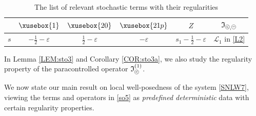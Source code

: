 \documentclass[%
11pt,  reqno]{amsart}
\def\<#1>{\xusebox{#1}}
\newcommand{\pe}{\mathbin{\scaleobj{0.7}{\tikz \draw (0,0) node[shape=circle,draw,inner sep=0pt,minimum size=8.5pt] {\scriptsize  $=$};}}}
\newcommand{\pl}{\mathbin{\scaleobj{0.7}{\tikz \draw (0,0) node[shape=circle,draw,inner sep=0pt,minimum size=8.5pt] {\scriptsize $<$};}}}
\newcommand{\1}{\hspace{0.2mm}\text{I}\hspace{0.2mm}}
\newcommand{\noi}{\noindent}
\renewcommand{\L}{\mathcal{L}}
\newcommand{\eps}{\varepsilon}
\newcommand{\If}{\mathfrak{I}}
\numberwithin{equation}{section}
\numberwithin{theorem}{section}
\begin{document}
\begin{table}[h]
  \begin{tabular}{|l||c|c|c|c|c|}
\hline
&  \rule{0mm}{5mm} 
\hspace*{2.5mm}  $\<1>$ \hspace*{3mm}
&\hspace*{3mm}  $\<20>$ \hspace*{4mm}
&\hspace*{3mm}  $\<21p>$ \hspace*{4mm}
&\hspace*{4.5mm}  $Z$ \hspace*{5.5mm} 
& $\If_{\pl, \pe}$ 
\\
\hline
\rule[-2.5mm]{0mm}{7mm}
$s$  
\hspace*{1.5mm} & $- \frac12 -\eps$ & $ \frac12 -\eps$ & $-\eps$  
& $s_1 - \frac 12 -\eps$
& \hspace*{2mm}$\L_1$ in \eqref{L2}\hspace*{2mm}
\\
\hline
  \end{tabular}

\vspace{4mm}
  \caption{The list of relevant stochastic terms
  with their regularities}
  \label{TAB:1}
\end{table}

\noi
In  Lemma \ref{LEM:sto3}
and Corollary \ref{COR:sto3a}, 
we also study 
the regularity property
of the paracontrolled operator $ \If_{\pl}^{(1)}$.


We now state our main result
on local well-posedness of the system \eqref{SNLW7}, 
viewing the terms and operators in \eqref{so5}
as {\it predefined deterministic} data
with certain regularity properties.
\end{document}
